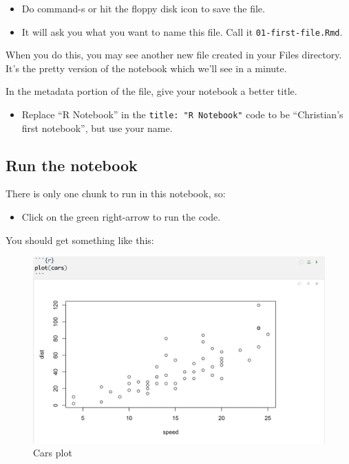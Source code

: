 \documentclass[]{book}
\providecommand{\tightlist}{%
  \setlength{\itemsep}{0pt}\setlength{\parskip}{0pt}}
\begin{document}
\begin{itemize}
\tightlist
\item
  Do command-s or hit the floppy disk icon to save the file.
\item
  It will ask you what you want to name this file. Call it
  \texttt{01-first-file.Rmd}.
\end{itemize}

When you do this, you may see another new file created in your Files
directory. It's the pretty version of the notebook which we'll see in a
minute.

In the metadata portion of the file, give your notebook a better title.

\begin{itemize}
\tightlist
\item
  Replace ``R Notebook'' in the \texttt{title:\ "R\ Notebook"} code to
  be ``Christian's first notebook'', but use your name.
\end{itemize}

\subsection{Run the notebook}\label{run-the-notebook}

There is only one chunk to run in this notebook, so:

\begin{itemize}
\tightlist
\item
  Click on the green right-arrow to run the code.
\end{itemize}

You should get something like this:

\begin{figure}
\centering
\includegraphics[width=6.25000in]{images/intro-defaultplot.png}
\caption{Cars plot}
\end{figure}
\end{document}
